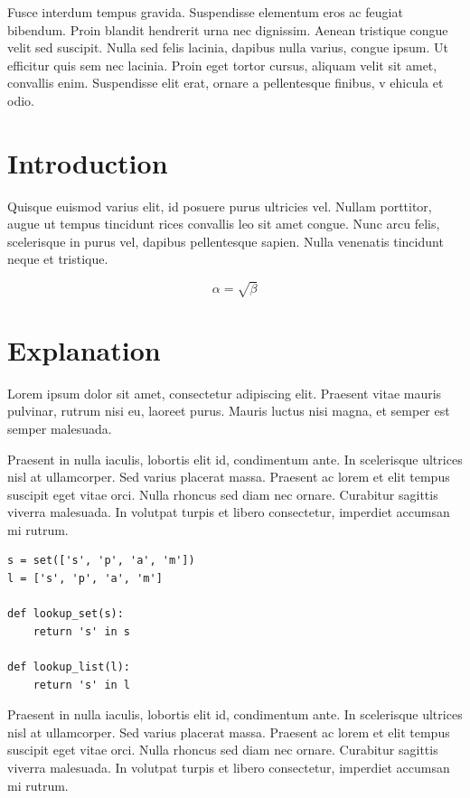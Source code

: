 \documentclass[a4paper, 12pt]{report}
\begin{document}
Fusce interdum tempus gravida. Suspendisse elementum eros ac feugiat bibendum.
Proin blandit hendrerit urna nec dignissim. Aenean tristique congue velit sed
suscipit. Nulla sed felis lacinia, dapibus nulla varius, congue ipsum. Ut
efficitur quis sem nec lacinia. Proin eget tortor cursus, aliquam velit sit
amet, convallis enim. Suspendisse elit erat, ornare a pellentesque finibus, v
ehicula et odio.

\section{Introduction}

Quisque euismod varius elit, id posuere purus ultricies vel. Nullam porttitor,
augue ut tempus tincidunt rices convallis leo sit amet congue. Nunc arcu felis,
scelerisque in purus vel, dapibus pellentesque sapien. Nulla venenatis
tincidunt neque et tristique.

\begin{equation}
    \label{simple_equation}
    \alpha = \sqrt{ \beta }
\end{equation}

\section{Explanation}

Lorem ipsum dolor sit amet, consectetur adipiscing elit. Praesent vitae mauris
pulvinar, rutrum nisi eu, laoreet purus. Mauris luctus nisi magna, et semper
est semper malesuada.

Praesent in nulla iaculis, lobortis elit id, condimentum
ante. In scelerisque ultrices nisl at ullamcorper. Sed varius placerat massa.
Praesent ac lorem et elit tempus suscipit eget vitae orci. Nulla rhoncus sed
diam nec ornare. Curabitur sagittis viverra malesuada. In volutpat turpis et
libero consectetur, imperdiet accumsan mi rutrum.

\begin{verbatim}
s = set(['s', 'p', 'a', 'm'])
l = ['s', 'p', 'a', 'm']

def lookup_set(s):
    return 's' in s

def lookup_list(l):
    return 's' in l
\end{verbatim}

Praesent in nulla iaculis, lobortis elit id, condimentum
ante. In scelerisque ultrices nisl at ullamcorper. Sed varius placerat massa.
Praesent ac lorem et elit tempus suscipit eget vitae orci. Nulla rhoncus sed
diam nec ornare. Curabitur sagittis viverra malesuada. In volutpat turpis et
libero consectetur, imperdiet accumsan mi rutrum.
\end{document}
